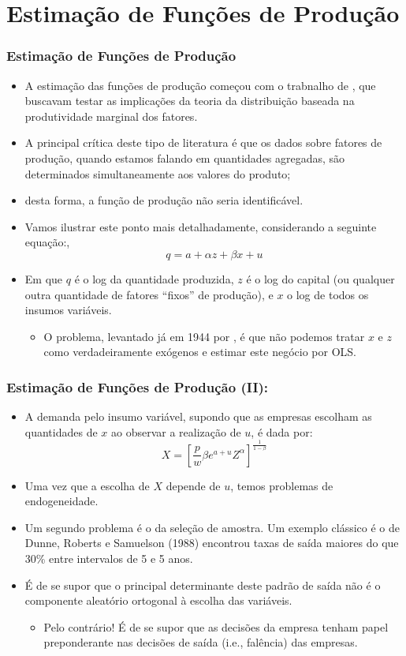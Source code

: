 \documentclass{beamer}
\begin{document}
\section{Estimação de Funções de Produção}
\begin{frame}\frametitle{Estimação de Funções de Produção}

\begin{itemize}
\item A estimação das funções de produção começou com o trabnalho de \citet{Cobb1928}, que buscavam testar as implicações da teoria da
distribuição baseada na produtividade marginal dos fatores.
\item A principal crítica deste tipo de literatura é que os dados sobre
fatores de produção, quando estamos falando em quantidades agregadas,
são determinados simultaneamente aos valores do produto; 
\item desta forma, a função de produção não seria identificável. 
\item Vamos ilustrar este ponto mais detalhadamente, considerando a seguinte
equação:,
\[
q=a+\alpha z+\beta x+u
\]
\item Em que $q$ é o log da quantidade produzida, $z$ é o log do capital
(ou qualquer outra quantidade de fatores ``fixos'' de produção),
e $x$ o log de todos os insumos variáveis. 

\begin{itemize}
\item O problema, levantado já em 1944 por \citet{Marschak1944b}, é que não
podemos tratar $x$ e $z$ como verdadeiramente exógenos e estimar
este negócio por OLS. 
\end{itemize}
\end{itemize}
\end{frame}

\begin{frame}\frametitle{Estimação de Funções de Produção (II):}
\small
\begin{itemize}
\item A demanda pelo insumo variável, supondo que as empresas escolham as
quantidades de $x$ ao observar a realização de $u$, é dada por:
\[
X=\left[\frac{p}{w}\beta e^{a+u}Z^{\alpha}\right]^{\frac{1}{1-\beta}}
\]
\item Uma vez que a escolha de $X$ depende de $u$, temos problemas de
endogeneidade.
\item Um segundo problema é o da seleção de amostra. Um exemplo clássico
é o de Dunne, Roberts e Samuelson (1988) encontrou taxas de saída
maiores do que 30\% entre intervalos de 5 e 5 anos.
\item É de se supor que o principal determinante deste padrão de saída não
é o componente aleatório ortogonal à escolha das variáveis.

\begin{itemize}
\item Pelo contrário! É de se supor que as decisões da empresa tenham papel
preponderante nas decisões de saída (i.e., falência) das empresas.
\end{itemize}
\end{itemize}
\end{frame}
\end{document}
